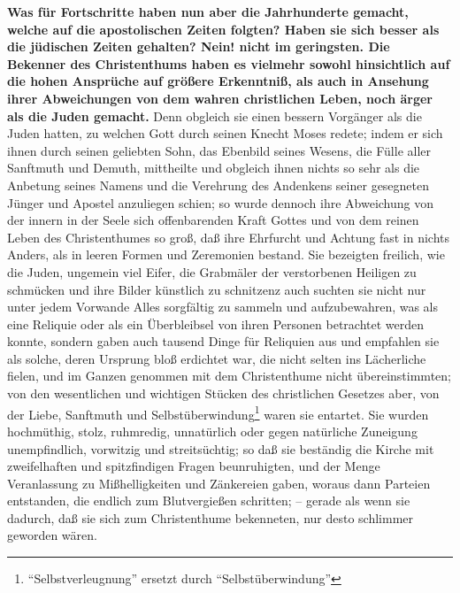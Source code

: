 \textbf{Was für Fortschritte  haben nun aber die Jahrhunderte gemacht, welche auf die
apostolischen Zeiten folgten? Haben sie sich besser als die jüdischen Zeiten
gehalten? Nein! nicht im geringsten. Die Bekenner des Christenthums haben es
vielmehr sowohl hinsichtlich auf die hohen Ansprüche auf größere Erkenntniß, als
auch in Ansehung ihrer Abweichungen von dem wahren christlichen Leben, noch
ärger als die Juden  gemacht.} Denn obgleich sie einen bessern Vorgänger als die
Juden hatten, zu welchen Gott durch seinen Knecht Moses  redete; indem er sich
ihnen durch seinen geliebten Sohn, das Ebenbild seines Wesens, die Fülle aller
Sanftmuth und Demuth, mittheilte und obgleich ihnen nichts so sehr als die
Anbetung seines Namens und die Verehrung des Andenkens seiner gesegneten Jünger
und Apostel anzuliegen schien; so wurde dennoch ihre Abweichung von der innern
in der Seele sich offenbarenden Kraft Gottes und von dem reinen Leben des
Christenthumes so groß, daß ihre Ehrfurcht und Achtung fast in nichts Anders,
als in leeren Formen und Zeremonien bestand. Sie bezeigten freilich, wie die
Juden, ungemein viel Eifer, die Grabmäler der verstorbenen Heiligen  zu schmücken
und ihre Bilder künstlich zu schnitzenz auch suchten sie nicht nur unter jedem
Vorwande Alles sorgfältig zu sammeln und aufzubewahren, was als eine Reliquie 
oder als ein Überbleibsel von ihren Personen betrachtet werden konnte, sondern
gaben auch tausend Dinge für Reliquien aus und empfahlen sie als solche, deren
Ursprung bloß erdichtet war, die nicht selten ins Lächerliche fielen, und im
Ganzen genommen mit dem Christenthume nicht übereinstimmten; von den
wesentlichen und wichtigen Stücken des christlichen Gesetzes aber, von der
Liebe, Sanftmuth und Selbstüberwindung\footnote{"`Selbstverleugnung"' ersetzt durch "`Selbstüberwindung"'} waren sie entartet. Sie wurden
hochmüthig, stolz, ruhmredig, unnatürlich oder gegen natürliche Zuneigung
unempfindlich, vorwitzig und streitsüchtig; so daß sie beständig die Kirche mit
zweifelhaften und spitzfindigen Fragen  beunruhigten, und der Menge Veranlassung
zu Mißhelligkeiten und Zänkereien gaben, woraus dann Parteien entstanden, die
endlich zum Blutvergießen schritten; -- gerade als wenn sie dadurch, daß sie
sich zum Christenthume bekenneten, nur desto schlimmer geworden wären.

\medskip

